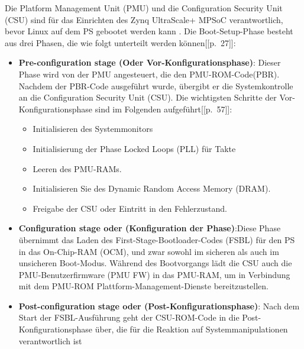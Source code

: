 Die Platform Management Unit (PMU) und die Configuration Security Unit (CSU) sind für das Einrichten des Zynq UltraScale+ MPSoC verantwortlich, bevor Linux auf dem PS gebootet werden kann . Die Boot-Setup-Phase besteht aus drei Phasen, die wie folgt unterteilt werden können[\cite{XilinxInc.2019}[p.~27]]:
\begin{itemize}
	\item \textbf{Pre-configuration stage (Oder Vor-Konfigurationsphase)}: Dieser Phase wird von der PMU angesteuert, die den PMU-ROM-Code(PBR). Nachdem der PBR-Code ausgeführt wurde, übergibt er die Systemkontrolle an die Configuration Security Unit (CSU). Die wichtigsten Schritte der Vor-Konfigurationsphase sind im Folgenden aufgeführt[\cite{XilinxInc.2019}[p.~57]]:
	\begin{itemize}
		\item Initialisieren des Systemmonitors
		\item Initialisierung der Phase Locked Loops (PLL) für Takte
		\item Leeren des PMU-RAMs.
		\item Initialisieren Sie des Dynamic Random Access Memory (DRAM).
		\item Freigabe der CSU oder Eintritt in den Fehlerzustand.
	\end{itemize}
	\item \textbf{Configuration stage oder (Konfiguration der Phase)}:Diese Phase übernimmt das Laden des First-Stage-Bootloader-Codes (FSBL) für den PS in das On-Chip-RAM (OCM), und zwar sowohl im sicheren als auch im unsicheren Boot-Modus. Während des Bootvorgangs lädt die CSU auch die PMU-Benutzerfirmware (PMU FW) in das PMU-RAM, um in Verbindung mit dem PMU-ROM Plattform-Management-Dienste bereitzustellen.
	\item \textbf{Post-configuration stage oder (Post-Konfigurationsphase)}: Nach dem Start der FSBL-Ausführung geht der CSU-ROM-Code in die Post-Konfigurationsphase über, die für die Reaktion auf Systemmanipulationen verantwortlich ist
\end{itemize}


